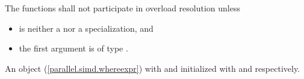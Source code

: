 \begin{itemdescr}
  \pnum\remarks
  The functions shall not participate in overload resolution unless

  \begin{itemize}
    \item {} is neither a  nor a  specialization, and
    \item the first argument is of type .
  \end{itemize}

  \pnum\returns
  An object (\ref{parallel.simd.whereexpr}) with  and  initialized with  and  respectively.
\end{itemdescr}
